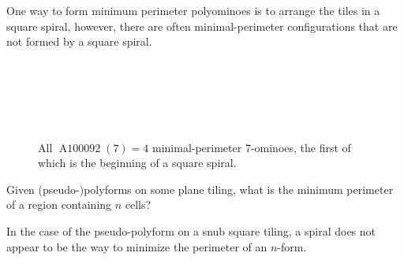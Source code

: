 \documentclass{article}
\begin{document}
One way to form minimum perimeter polyominoes is to arrange the tiles in a
square spiral, however, there are often minimal-perimeter configurations that
are not formed by a square spiral.
\begin{figure}[ht!]
  \centering
  ~~~
  ~~~
  ~~~
  \caption{
    All $\operatorname{A100092}(7) = 4$ minimal-perimeter $7$-ominoes, the first
    of which is the beginning of a square spiral.
  }
\end{figure}
\begin{question}
  Given (pseudo-)polyforms on some plane tiling, what is the minimum perimeter
  of a region containing $n$ cells?
\end{question}

\begin{note}
  In the case of the pseudo-polyform on a snub square tiling, a spiral does not
  appear to be the way to minimize the perimeter of an $n$-form.
\end{note}
\end{document}
